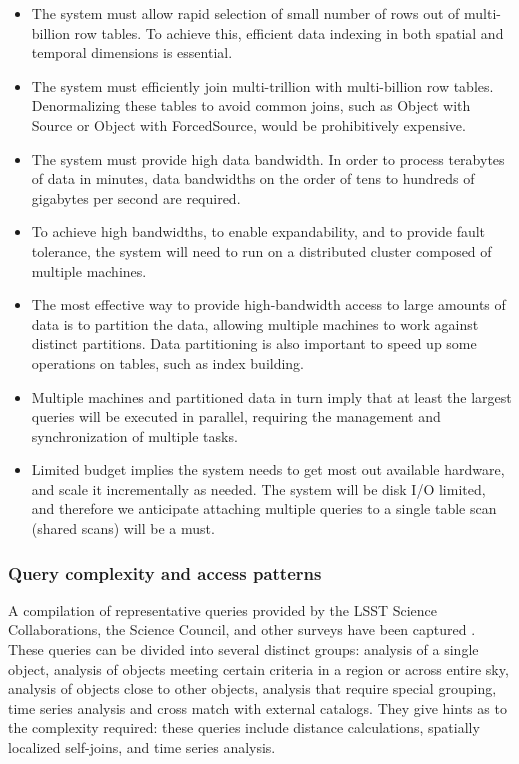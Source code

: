 \documentclass[DM,lsstdraft,toc]{lsstdoc}
\begin{document}
\begin{itemize}
\item
  The system must allow rapid selection of small number of rows out of
  multi-billion row tables. To achieve this, efficient data indexing in
  both spatial and temporal dimensions is essential.
\item
  The system must efficiently join multi-trillion with multi-billion row
  tables. Denormalizing these tables to avoid common joins, such as
  Object with Source or Object with ForcedSource, would be prohibitively
  expensive.
\item
  The system must provide high data bandwidth. In order to process
  terabytes of data in minutes, data bandwidths on the order of tens to
  hundreds of gigabytes per second are required.
\item
  To achieve high bandwidths, to enable expandability, and to provide
  fault tolerance, the system will need to run on a distributed cluster
  composed of multiple machines.
\item
  The most effective way to provide high-bandwidth access to large
  amounts of data is to partition the data, allowing multiple machines
  to work against distinct partitions. Data partitioning is also
  important to speed up some operations on tables, such as index
  building.
\item
  Multiple machines and partitioned data in turn imply that at least the
  largest queries will be executed in parallel, requiring the management
  and synchronization of multiple tasks.
\item
  Limited budget implies the system needs to get most out available
  hardware, and scale it incrementally as needed. The system will be
  disk I/O limited, and therefore we anticipate attaching multiple
  queries to a single table scan (shared scans) will be a must.
\end{itemize}

\subsubsection{Query complexity and access
patterns}\label{query-complexity-and-access-patterns}

A compilation of representative queries provided by the LSST Science
Collaborations, the Science Council, and other surveys have been
captured \citep{CommonQueries}. These queries can be divided into
several distinct groups: analysis of a single object, analysis of
objects meeting certain criteria in a region or across entire sky,
analysis of objects close to other objects, analysis that require
special grouping, time series analysis and cross match with external
catalogs. They give hints as to the complexity required: these queries
include distance calculations, spatially localized self-joins, and time
series analysis.
\end{document}
